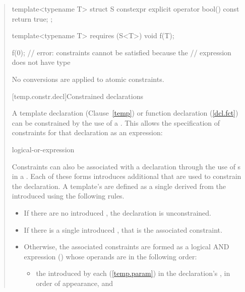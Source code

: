 \begin{quote}
\begin{addedblock}
\begin{codeblock}
template<typename T>
  struct S {
    constexpr explicit operator bool() const { return true; }
  };

template<typename T>
  requires (S<T>{})
    void f(T);

f(0); // error: constraints cannot be satisfied because the
      // expression  does not have type 
\end{codeblock}
No conversions are applied to atomic constraints.
\exitexample


[temp.constr.decl]{Constrained declarations}

\pnum
A template declaration (Clause~\ref{temp}) or function declaration 
(\ref{dcl.fct}) can be constrained by the use of a 
. 
% 
This allows the specification of constraints for that declaration as
an expression:

\begin{bnf}
\br
    logical-or-expression
\end{bnf}

\pnum
Constraints can also be associated with a declaration through the use of 
s in a 
.
% 
Each of these forms introduces additional  
that are used to constrain the declaration.
% 
A template's  are defined as a 
single  derived from the
introduced  using the
following rules.

\begin{itemize}
\item If there are no introduced ,
the declaration is unconstrained.

\item If there is a single introduced ,
that is the associated constraint.

\item Otherwise, the associated constraints are formed as a logical 
AND expression () whose operands are in the following order:
% 
\begin{itemize}
\item the  introduced by each
       (\ref{temp.param}) in the 
      declaration's , in
      order of appearance, and


\end{itemize}
\end{itemize}
\end{addedblock}
\end{quote}

